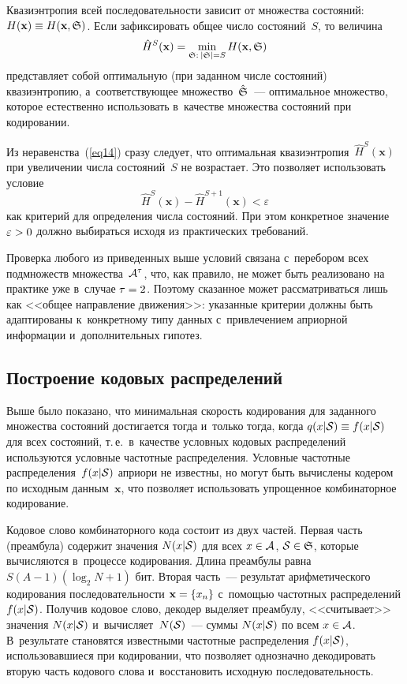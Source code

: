 \begin{multicols}{2}
Квазиэнтропия всей последовательности зависит от множества состояний: 
$H(\mathbf{x})\equiv H(\mathbf{x},{\frak S})$. Если зафиксировать общее 
число состояний~$S$, то величина
\begin{equation}
\label{eq15}
\hat{H}^{S}(\mathbf{x}) = \min\limits_{{\frak S}:\:|{\frak S}|=S} 
H(\mathbf{x},{\frak S})
\end{equation}
представляет собой оптимальную (при заданном числе состояний) 
квазиэнтропию, а~соответ\-ст\-ву\-ющее мно\-жество~$\hat{\frak S}$~--- 
оптимальное мно\-жество, которое естественно использовать в~качестве 
мно\-же\-ст\-ва состояний при кодировании.

Из неравенства~(\ref{eq14}) сразу следует, что оптимальная 
квазиэнтропия~$\hat{H}^{S}(\mathbf{x})$ при увеличении числа состояний~$S$ 
не возрастает. Это позволяет использовать условие
$$
\hat{H}^{S}(\mathbf{x}) - \hat{H}^{S+1}(\mathbf{x}) < \varepsilon
$$
как критерий для определения числа состояний. При этом конкретное 
значение $\varepsilon\hm>0$ должно выбираться исходя из практических требований.

Проверка любого из приведенных выше условий связана с~перебором 
всех подмножеств множества~${\cal A}^\tau$, что, как правило, не может 
быть реализовано на практике уже в~случае $\tau\hm=2$. Поэтому сказанное может 
рассматриваться лишь как <<общее направление движения>>: указанные критерии 
должны быть адаптированы к~конкретному типу данных с~привлечением априорной 
информации и~дополнительных гипотез.

\subsection{Построение кодовых распределений}

Выше было показано, что минимальная скорость кодирования для 
заданного множества состояний достигается тогда и~только тогда, 
когда $q(x|{\cal S})\hm\equiv f(x|{\cal S})$ для всех состояний, т.\,е.\
 в~качестве условных кодовых распределений используются условные частотные 
 распределения. Условные частотные распределения~$f(x|{\cal S})$ 
 априори не известны, но могут быть вычислены кодером по исходным 
 данным~$\mathbf{x}$, что позволяет использовать упрощенное комбинаторное 
 кодирование.

Кодовое слово комбинаторного кода состоит из двух частей. Первая часть 
(преамбула) содержит значения $N(x|{\cal S})$ для всех $x\hm\in{\cal A}$,  
${\cal S}\hm\in{\frak S}$, которые вычисляются в~процессе кодирования. 
Длина преамбулы равна $S(A-1)(\log_{2}N+1)$ бит. Вторая часть~--- 
результат арифметического кодирования последовательности $\mathbf{x}\hm=\{x_n\}$ 
с~по\-мощью частотных распределений $f(x|{\cal S})$. Получив кодовое слово, 
декодер выделяет преамбулу, <<считывает>> значения $N(x|{\cal S})$ 
и~вычисляет~$N({\cal S})$~--- суммы $N(x|{\cal S})$ по всем $x\hm\in{\cal A}$. 
В~результате становятся известными частотные распределения $f(x|{\cal S})$, 
использовавшиеся при кодировании, что позволяет однозначно декодировать 
вторую часть кодового слова и~восстановить исходную последовательность.


\end{multicols}
